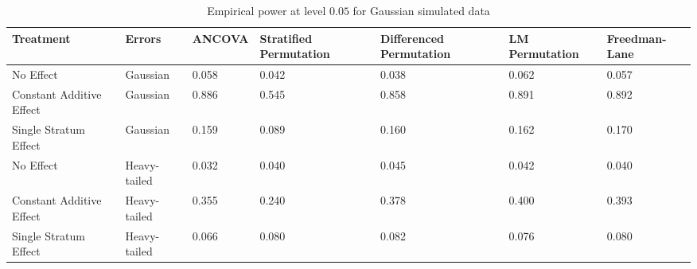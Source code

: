 \begin{table}[ht]
\centering
\begin{tabular}{p{1.15in}|p{0.7in}|p{0.6in}p{0.8in}p{0.8in}p{0.8in}p{0.75in}}
  \hline
Treatment & Errors & ANCOVA & Stratified Permutation & Differenced Permutation & LM Permutation & Freedman-Lane \\ 
  \hline
No Effect & Gaussian & 0.058 & 0.042 & 0.038 & 0.062 & 0.057 \\ 
  Constant Additive Effect & Gaussian & 0.886 & 0.545 & 0.858 & 0.891 & 0.892 \\ 
  Single Stratum Effect & Gaussian & 0.159 & 0.089 & 0.160 & 0.162 & 0.170 \\ 
   \hline
No Effect & Heavy-tailed & 0.032 & 0.040 & 0.045 & 0.042 & 0.040 \\ 
  Constant Additive Effect & Heavy-tailed & 0.355 & 0.240 & 0.378 & 0.400 & 0.393 \\ 
  Single Stratum Effect & Heavy-tailed & 0.066 & 0.080 & 0.082 & 0.076 & 0.080 \\ 
   \hline
\end{tabular}
\caption{Empirical power at level $0.05$ for Gaussian simulated data} 
\label{tab:normal_power}
\end{table}
